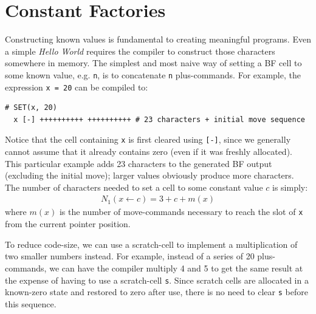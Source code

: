 \section{Constant Factories}
Constructing known values is fundamental to creating meaningful programs. Even a simple \emph{Hello World} requires the compiler to construct those characters somewhere in memory. The simplest and most naive way of setting a BF cell to some known value, e.g. \texttt{n}, is to concatenate \texttt{n} plus-commands. For example, the expression \texttt{x = 20} can be compiled to:
\begin{lstlisting}[style=brainfuck]
  # SET(x, 20)
  x [-] ++++++++++ ++++++++++ # 23 characters + initial move sequence
\end{lstlisting}
Notice that the cell containing \texttt{x} is first cleared using \texttt{[-]}, since we generally cannot assume that it already contains zero (even if it was freshly allocated). This particular example adds 23 characters to the generated BF output (excluding the initial move); larger values obviously produce more characters. The number of characters needed to set a cell to some constant value $c$ is simply:
\begin{align}
  N_1(x\leftarrow c) = 3 + c + m(x)
\end{align}
where $m(x)$ is the number of move-commands necessary to reach the slot of \texttt{x} from the current pointer position.

To reduce code-size, we can use a scratch-cell to implement a multiplication of two smaller numbers instead. For example, instead of a series of 20 plus-commands, we can have the compiler multiply 4 and 5 to get the same result at the expense of having to use a scratch-cell \texttt{s}. Since scratch cells are allocated in a known-zero state and restored to zero after use, there is no need to clear \texttt{s} before this sequence.

